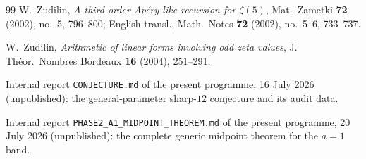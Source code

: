 \documentclass[11pt,reqno]{amsart}
\theoremstyle{plain}
\theoremstyle{definition}
\theoremstyle{remark}
\numberwithin{equation}{section}
\begin{document}
\begin{thebibliography}{99}
W.~Zudilin, \emph{A third-order Ap\'ery-like recursion for $\zeta(5)$}, Mat.\ Zametki
\textbf{72} (2002), no.~5, 796--800; English transl., Math.\ Notes \textbf{72} (2002),
no.~5--6, 733--737.

W.~Zudilin, \emph{Arithmetic of linear forms involving odd zeta values}, J. Th\'eor.\ Nombres
Bordeaux \textbf{16} (2004), 251--291.

Internal report \texttt{CONJECTURE.md} of the present programme, 16 July 2026 (unpublished):
the general-parameter sharp-$12$ conjecture and its audit data.

Internal report \texttt{PHASE2\_A1\_MIDPOINT\_THEOREM.md} of the present programme,
20 July 2026 (unpublished): the complete generic midpoint theorem for the $a=1$ band.

\end{thebibliography}
\end{document}
